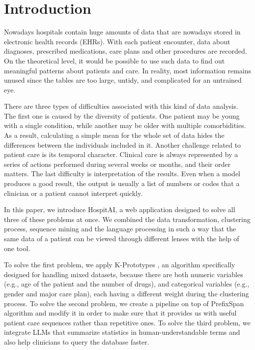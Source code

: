 \section{Introduction}

Nowadays hospitals contain huge amounts of data that are nowadays stored in electronic health records (EHRs). With each patient encounter, data about diagnoses, prescribed medications, care plans and other procedures are recorded. On the theoretical level, it would be possible to use such data to find out meaningful patterns about patients and care. In reality, most information remains unused since the tables are too large, untidy, and complicated for an untrained eye.

There are three types of difficulties associated with this kind of data analysis. The first one is caused by the diversity of patients. One patient may be young with a single condition, while another may be older with multiple comorbidities. As a result, calculating a simple mean for the whole set of data hides the differences between the individuals included in it. Another challenge related to patient care is its temporal character. Clinical care is always represented by a series of actions performed during several weeks or months, and their order matters. The last difficulty is interpretation of the results. Even when a model produces a good result, the output is usually a list of numbers or codes that a clinician or a patient cannot interpret quickly.

In this paper, we introduce HospitAI, a web application designed to solve all three of these problems at once. We combined the data transformation, clustering process, sequence mining and the language processing in such a way that the same data of a patient can be viewed through different lenses with the help of one tool.

To solve the first problem, we apply K-Prototypes \cite{huang1998kprototypes}, an algorithm specifically designed for handling mixed datasets, because there are both numeric variables (e.g., age of the patient and the number of drugs), and categorical variables (e.g., gender and major care plan), each having a different weight during the clustering process. To solve the second problem, we create a pipeline on top of PrefixSpan algorithm \cite{pei2004prefixspan} and modify it in order to make sure that it provides us with useful patient care sequences rather than repetitive ones. To solve the third problem, we integrate LLMs that summarize statistics in human-understandable terms and also help clinicians to query the database faster.

